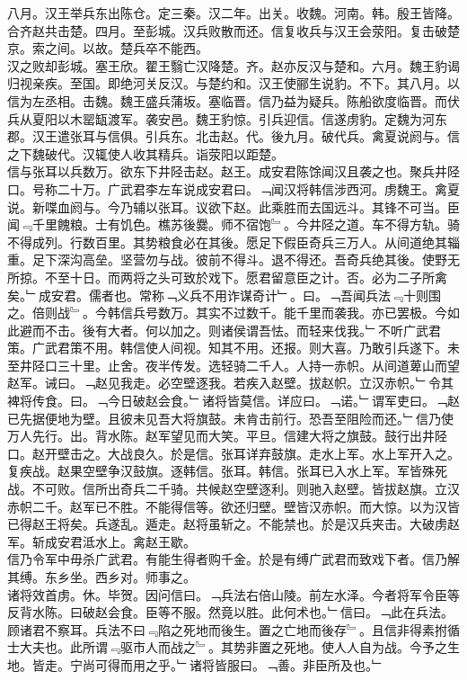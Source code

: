 \documentclass{zhvt-classic}
\begin{document}
\hspace*{2em}八月。汉王举兵东出陈仓。定三秦。汉二年。出关。收魏。河南。韩。殷王皆降。合齐赵共击楚。四月。至彭城。汉兵败散而还。信复收兵与汉王会荥阳。复击破楚京。索之间。以故。楚兵卒不能西。\\
\hspace*{2em}汉之败却彭城。塞王欣。翟王翳亡汉降楚。齐。赵亦反汉与楚和。六月。魏王豹谒归视亲疾。至国。即绝河关反汉。与楚约和。汉王使郦生说豹。不下。其八月。以信为左丞相。击魏。魏王盛兵蒲坂。塞临晋。信乃益为疑兵。陈船欲度临晋。而伏兵从夏阳以木罂缻渡军。袭安邑。魏王豹惊。引兵迎信。信遂虏豹。定魏为河东郡。汉王遣张耳与信俱。引兵东。北击赵。代。後九月。破代兵。禽夏说阏与。信之下魏破代。汉辄使人收其精兵。诣荥阳以距楚。\\
\hspace*{2em}信与张耳以兵数万。欲东下井陉击赵。赵王。成安君陈馀闻汉且袭之也。聚兵井陉口。号称二十万。广武君李左车说成安君曰。﹁闻汉将韩信涉西河。虏魏王。禽夏说。新喋血阏与。今乃辅以张耳。议欲下赵。此乘胜而去国远斗。其锋不可当。臣闻﹃千里餽粮。士有饥色。樵苏後爨。师不宿饱﹄。今井陉之道。车不得方轨。骑不得成列。行数百里。其势粮食必在其後。愿足下假臣奇兵三万人。从间道绝其辎重。足下深沟高垒。坚营勿与战。彼前不得斗。退不得还。吾奇兵绝其後。使野无所掠。不至十日。而两将之头可致於戏下。愿君留意臣之计。否。必为二子所禽矣。﹂成安君。儒者也。常称﹁义兵不用诈谋奇计﹂。曰。﹁吾闻兵法﹃十则围之。倍则战﹄。今韩信兵号数万。其实不过数千。能千里而袭我。亦已罢极。今如此避而不击。後有大者。何以加之。则诸侯谓吾怯。而轻来伐我。﹂不听广武君策。广武君策不用。韩信使人间视。知其不用。还报。则大喜。乃敢引兵遂下。未至井陉口三十里。止舍。夜半传发。选轻骑二千人。人持一赤帜。从间道萆山而望赵军。诫曰。﹁赵见我走。必空壁逐我。若疾入赵壁。拔赵帜。立汉赤帜。﹂令其裨将传食。曰。﹁今日破赵会食。﹂诸将皆莫信。详应曰。﹁诺。﹂谓军吏曰。﹁赵已先据便地为壁。且彼未见吾大将旗鼓。未肯击前行。恐吾至阻险而还。﹂信乃使万人先行。出。背水陈。赵军望见而大笑。平旦。信建大将之旗鼓。鼓行出井陉口。赵开壁击之。大战良久。於是信。张耳详弃鼓旗。走水上军。水上军开入之。复疾战。赵果空壁争汉鼓旗。逐韩信。张耳。韩信。张耳已入水上军。军皆殊死战。不可败。信所出奇兵二千骑。共候赵空壁逐利。则驰入赵壁。皆拔赵旗。立汉赤帜二千。赵军已不胜。不能得信等。欲还归壁。壁皆汉赤帜。而大惊。以为汉皆已得赵王将矣。兵遂乱。遁走。赵将虽斩之。不能禁也。於是汉兵夹击。大破虏赵军。斩成安君泜水上。禽赵王歇。\\
\hspace*{2em}信乃令军中毋杀广武君。有能生得者购千金。於是有缚广武君而致戏下者。信乃解其缚。东乡坐。西乡对。师事之。\\
\hspace*{2em}诸将效首虏。休。毕贺。因问信曰。﹁兵法右倍山陵。前左水泽。今者将军令臣等反背水陈。曰破赵会食。臣等不服。然竟以胜。此何术也。﹂信曰。﹁此在兵法。顾诸君不察耳。兵法不曰﹃陷之死地而後生。置之亡地而後存﹄。且信非得素拊循士大夫也。此所谓﹃驱市人而战之﹄。其势非置之死地。使人人自为战。今予之生地。皆走。宁尚可得而用之乎。﹂诸将皆服曰。﹁善。非臣所及也。﹂\\
\end{document}
